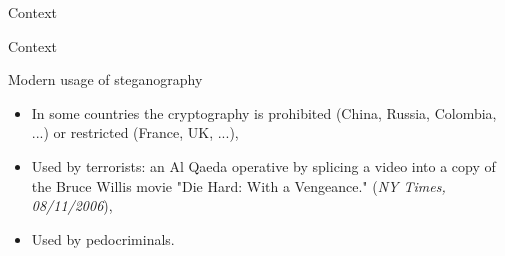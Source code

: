 \documentclass[10pt,aspectratio=169]{beamer}
\begin{document}
\begin{frame}{Context}
\end{frame}


\begin{frame}{Context}

    \begin{figure}[h]
    \end{figure}
    
    \pause \pause \pause \pause \pause \pause \pause \pause

\end{frame}



\begin{frame}{Modern usage of steganography}
    \begin{itemize}
        \setlength\itemsep{2em}
        \item In some countries the cryptography is prohibited (China, Russia, Colombia, ...) or restricted (France, UK, ...), 
        \item Used by terrorists: an Al Qaeda operative by splicing a video into a copy of the Bruce Willis movie "Die Hard:
        With a Vengeance." (\textit{NY Times, 08/11/2006}),
        \item Used by pedocriminals.
    \end{itemize}
\end{frame}



\end{document}
